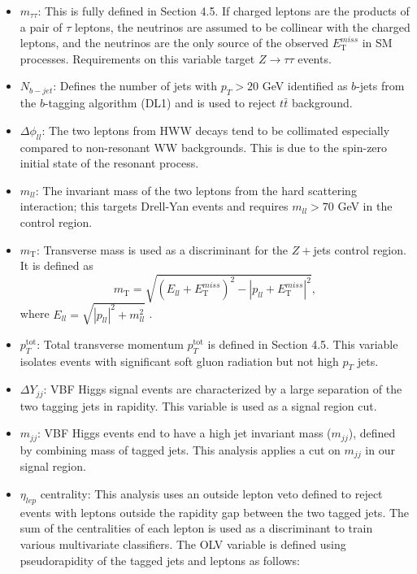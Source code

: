 \begin{itemize}
\item $m_{\tau \tau}$: This is fully defined in Section 4.5. If charged leptons are the products of a pair of $\tau$ leptons, the neutrinos are assumed to be collinear with the charged leptons, and the neutrinos are the only source of the observed $E_\mathrm{{T}}^{miss}$ in SM processes. Requirements on this variable target $Z\rightarrow \tau\tau$ events. 
\item $N_{b-jet}$: Defines the number of jets with $p_T >20$ GeV identified as $b$-jets from the $b$-tagging algorithm (DL1) and is used to reject $t\bar{t}$ background.
\item $\Delta \phi_{ll}$: The two leptons from HWW decays tend to be collimated especially compared to non-resonant WW backgrounds. This is due to the spin-zero initial state of the resonant process. 
\item $m_{ll}$: The invariant mass of the two leptons from the hard scattering interaction; this targets Drell-Yan events and requires $m_{ll}>70$ GeV in the control region.
\item $m_\mathrm{{T}}$: Transverse mass is used as a discriminant for the $Z+$jets control region. It is defined as
\begin{equation}
m_\mathrm{{T}} = \sqrt{ {(E_{ll} + E_\mathrm{{T}}^{miss})}^2 - {|p_{ll} + E_\mathrm{{T}}^{miss}|}^2 },
\end{equation}
  where $E_{ll} = \sqrt{|p_{ll}|^2 + m_{ll}^2 }$ .
\item $p_T^\mathrm{tot}$:
Total transverse momentum $p_T^\mathrm{tot}$ is defined in Section 4.5. This variable isolates events with significant soft gluon radiation but not high $p_T$ jets.
\item  $\Delta Y_{jj}$: VBF Higgs signal events are characterized by a large separation of the two tagging jets in rapidity. This variable is used as a signal region cut. 
\item $m_{jj}$:
VBF Higgs events end to have a high jet invariant mass ($m_{jj}$), defined by combining mass of tagged jets. This analysis applies a cut on $m_{jj}$ in our signal region. 
\item $\eta_{lep}$ centrality: This analysis uses an outside lepton veto defined to reject events with leptons outside the rapidity gap between the two tagged jets. The sum of the centralities of each lepton is used as a discriminant to train various multivariate classifiers. The OLV variable is defined using pseudorapidity of the tagged jets and leptons as follows:

\end{itemize}
